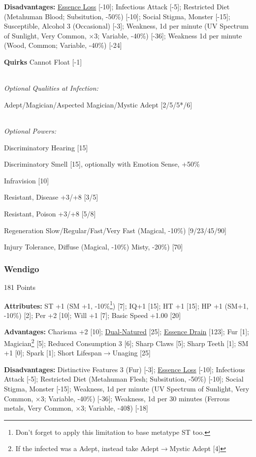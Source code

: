 \begin{multicols*}{3}
	\textbf{Disadvantages:}	
	\hyperref[essence_loss]{Essence Loss} [-10]; Infectious Attack [-5]; Restricted Diet (Metahuman Blood; Subsitution, -50\%) [-10]; Social Stigma, Monster [-15]; Susceptible, Alcohol 3 (Occasional) [-3]; Weakness, 1d per minute (UV Spectrum of Sunlight, Very Common, $\times$3; Variable, -40\%) [-36]; Weakness 1d per minute (Wood, Common; Variable, -40\%) [-24]
	
	\textbf{Quirks} 
	Cannot Float [-1]
	
	\textit{\\Optional Qualities at Infection:}
	
	Adept/Magician/Aspected Magician/Mystic Adept [2/5/5*/6]	
	
	\textit{\\Optional Powers:}
		
	Discriminatory Hearing [15]
	
	Discriminatory Smell [15], optionally with Emotion Sense, +50\%
	
	Infravision [10]
	
	Resistant, Disease +3/+8 [3/5]
	
	Resistant, Poison +3/+8 [5/8]
	
	Regeneration Slow/Regular/Fast/Very Fast (Magical, -10\%) [9/23/45/90]
	
	Injury Tolerance, Diffuse (Magical, -10\%) Misty, -20\%) [70]
	
	\subsubsection{Wendigo}\label{wendigo}
	\begin{flushright}
		181 Points
	\end{flushright}
		
	\textbf{Attributes:}
	ST +1 (SM +1, -10\%\footnote{Don't forget to apply this limitation to base metatype ST too.}) [7]; IQ+1 [15]; HT +1 [15]; HP +1 (SM+1, -10\%) [2]; Per +2 [10]; Will +1 [7]; Basic Speed +1.00 [20]
	
	\textbf{Advantages:}
	Charisma +2 [10]; \hyperref[dual_natured]{Dual-Natured} [25]; \hyperref[essence_drain]{Essence Drain} [123]; Fur [1]; Magician\footnote{If the infected was a Adept, instead take Adept$\rightarrow$Mystic Adept [4]} [5]; Reduced Consumption 3 [6]; Sharp Claws [5]; Sharp Teeth [1]; SM +1 [0]; Spark [1]; Short Lifespan$\rightarrow$Unaging [25]
	
	\textbf{Disadvantages:}	
	Distinctive Features 3 (Fur) [-3]; \hyperref[essence_loss]{Essence Loss} [-10]; Infectious Attack [-5]; Restricted Diet (Metahuman Flesh; Subsitution, -50\%) [-10]; Social Stigma, Monster [-15]; Weakness, 1d per minute (UV Spectrum of Sunlight, Very Common, $\times$3; Variable, -40\%) [-36]; Weakness, 1d per 30 minutes (Ferrous metals, Very Common, $\times$3; Variable, -40\$) [-18]
		

\end{multicols*}
